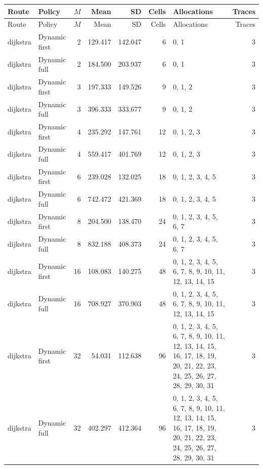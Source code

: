 \documentclass[10pt,a4paper]{article}
\begin{document}
\tiny\setlength{\tabcolsep}{2pt}\begin{longtable}{@{}p{23mm}p{29mm}rrrrp{36mm}r@{}}
\toprule Route & Policy & $M$ & Mean & SD & Cells & Allocations & Traces \\ \midrule\endfirsthead
\toprule Route & Policy & $M$ & Mean & SD & Cells & Allocations & Traces \\ \midrule\endhead
\bottomrule\endfoot
dijkstra & Dynamic first & 2 & 129.417 & 142.047 & 6 & 0, 1 & 3 \\
dijkstra & Dynamic full & 2 & 184.500 & 203.937 & 6 & 0, 1 & 3 \\
dijkstra & Dynamic first & 3 & 197.333 & 149.526 & 9 & 0, 1, 2 & 3 \\
dijkstra & Dynamic full & 3 & 396.333 & 333.677 & 9 & 0, 1, 2 & 3 \\
dijkstra & Dynamic first & 4 & 235.292 & 147.761 & 12 & 0, 1, 2, 3 & 3 \\
dijkstra & Dynamic full & 4 & 559.417 & 401.769 & 12 & 0, 1, 2, 3 & 3 \\
dijkstra & Dynamic first & 6 & 239.028 & 132.025 & 18 & 0, 1, 2, 3, 4, 5 & 3 \\
dijkstra & Dynamic full & 6 & 742.472 & 421.369 & 18 & 0, 1, 2, 3, 4, 5 & 3 \\
dijkstra & Dynamic first & 8 & 204.500 & 138.470 & 24 & 0, 1, 2, 3, 4, 5, 6, 7 & 3 \\
dijkstra & Dynamic full & 8 & 832.188 & 408.373 & 24 & 0, 1, 2, 3, 4, 5, 6, 7 & 3 \\
dijkstra & Dynamic first & 16 & 108.083 & 140.275 & 48 & 0, 1, 2, 3, 4, 5, 6, 7, 8, 9, 10, 11, 12, 13, 14, 15 & 3 \\
dijkstra & Dynamic full & 16 & 708.927 & 370.903 & 48 & 0, 1, 2, 3, 4, 5, 6, 7, 8, 9, 10, 11, 12, 13, 14, 15 & 3 \\
dijkstra & Dynamic first & 32 & 54.031 & 112.638 & 96 & 0, 1, 2, 3, 4, 5, 6, 7, 8, 9, 10, 11, 12, 13, 14, 15, 16, 17, 18, 19, 20, 21, 22, 23, 24, 25, 26, 27, 28, 29, 30, 31 & 3 \\
dijkstra & Dynamic full & 32 & 402.297 & 412.364 & 96 & 0, 1, 2, 3, 4, 5, 6, 7, 8, 9, 10, 11, 12, 13, 14, 15, 16, 17, 18, 19, 20, 21, 22, 23, 24, 25, 26, 27, 28, 29, 30, 31 & 3 \\
\end{longtable}\normalsize\setlength{\tabcolsep}{6pt}
\clearpage
\end{document}
